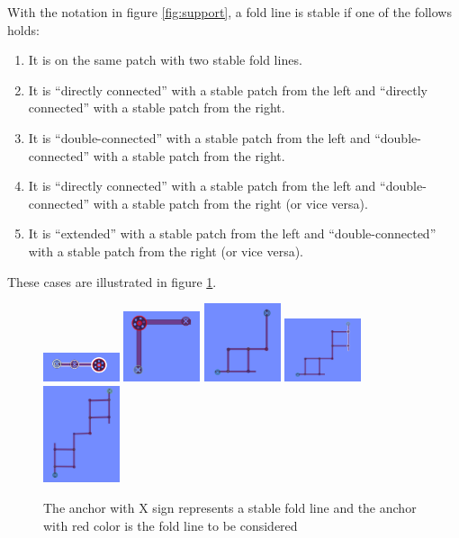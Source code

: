 With the notation in figure \ref{fig:support}, a fold line is stable if one of the follows holds:

\begin{enumerate}
\item It is on the same patch with two stable fold lines.
\item It is ``directly connected'' with a stable patch from the left and ``directly connected'' with a stable patch from the right.
\item It is ``double-connected'' with a stable patch from the left and ``double-connected'' with a stable patch from the right.
\item It is ``directly connected'' with a stable patch from the left and ``double-connected'' with a stable patch from the right (or vice versa).
\item It is ``extended'' with a stable patch from the left and ``double-connected'' with a stable patch from the right (or vice versa).
\end{enumerate}

These cases are illustrated in figure \ref{fig:stable}.

\begin{figure}[h]
  \includegraphics[width = 0.2\textwidth]{Figures/stable_1}
  \includegraphics[width = 0.2\textwidth]{Figures/stable_2}
  \includegraphics[width = 0.2\textwidth]{Figures/stable_3}
  \includegraphics[width = 0.2\textwidth]{Figures/stable_4}
  \includegraphics[width = 0.2\textwidth]{Figures/stable_5}
  \caption{The anchor with X sign represents a stable fold line and the anchor with red color is the fold line to be considered}
  \label{fig:stable}
\end{figure}

